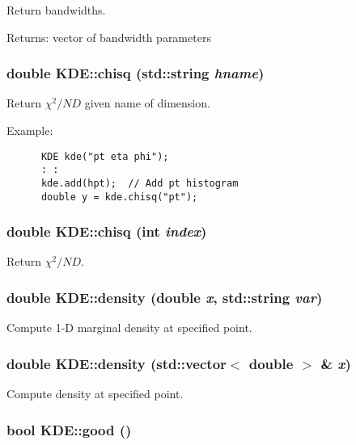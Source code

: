 Return bandwidths. 

\begin{Desc}
\item[Returns:]vector of bandwidth parameters \end{Desc}
\hypertarget{classKDE_a15}{
\subsubsection[chisq]{\setlength{\rightskip}{0pt plus 5cm}double KDE::chisq (std::string {\em hname})}}
\label{classKDE_a15}


Return $\chi^2/ND$ given name of dimension. 

Example: 

\footnotesize\begin{verbatim}      KDE kde("pt eta phi");
      : :
      kde.add(hpt);  // Add pt histogram
      double y = kde.chisq("pt");
\end{verbatim}
\normalsize
\hypertarget{classKDE_a14}{
\subsubsection[chisq]{\setlength{\rightskip}{0pt plus 5cm}double KDE::chisq (int {\em index})}}
\label{classKDE_a14}


Return $\chi^2/ND$. 

\hypertarget{classKDE_a9}{
\subsubsection[density]{\setlength{\rightskip}{0pt plus 5cm}double KDE::density (double {\em x}, std::string {\em var})}}
\label{classKDE_a9}


Compute 1-D marginal density at specified point. 

\hypertarget{classKDE_a8}{
\subsubsection[density]{\setlength{\rightskip}{0pt plus 5cm}double KDE::density (std::vector$<$ double $>$ \& {\em x})}}
\label{classKDE_a8}


Compute density at specified point. 

\hypertarget{classKDE_a3}{
\subsubsection[good]{\setlength{\rightskip}{0pt plus 5cm}bool KDE::good ()}}
\label{classKDE_a3}



